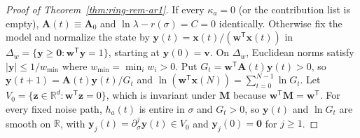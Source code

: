 \begin{proof}[Proof of Theorem~{\upshape\ref{thm:ring-rem-ar1}}]
If every $\kappa_a = 0$ (or the contribution list is empty), $\mathbf{A}(t) \equiv \mathbf{A}_0$ and $\ln\lambda - r(\sigma) = C = 0$ identically. Otherwise fix the model and normalize the state by $\mathbf{y}(t) = \mathbf{x}(t)/(\mathbf{w}^{\mathsf{T}}\mathbf{x}(t))$ in $\Delta_w = \{\mathbf{y} \ge \mathbf{0} : \mathbf{w}^{\mathsf{T}}\mathbf{y} = 1\}$, starting at $\mathbf{y}(0) = \mathbf{v}$. On $\Delta_w$, Euclidean norms satisfy $|\mathbf{y}| \le 1/w_{\min}$ where $w_{\min} = \min_i w_i > 0$. Put $G_t = \mathbf{w}^{\mathsf{T}}\mathbf{A}(t)\mathbf{y}(t) > 0$, so $\mathbf{y}(t + 1) = \mathbf{A}(t)\mathbf{y}(t)/G_t$ and $\ln(\mathbf{w}^{\mathsf{T}}\mathbf{x}(N)) = \sum_{t=0}^{N-1} \ln G_t$. Let $V_0 = \{\mathbf{z} \in \mathbb{R}^d : \mathbf{w}^{\mathsf{T}}\mathbf{z} = 0\}$, which is invariant under $\mathbf{M}$ because $\mathbf{w}^{\mathsf{T}}\mathbf{M} = \mathbf{w}^{\mathsf{T}}$. For every fixed noise path, $h_a(t)$ is entire in $\sigma$ and $G_t > 0$, so $\mathbf{y}(t)$ and $\ln G_t$ are smooth on $\mathbb{R}$, with $\mathbf{y}_j(t) = \partial_\sigma^j \mathbf{y}(t) \in V_0$ and $\mathbf{y}_j(0) = \mathbf{0}$ for $j \ge 1$.


\end{proof}
